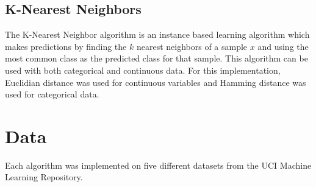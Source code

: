 \documentclass[11pt]{article}
\begin{document}
\subsection{K-Nearest Neighbors}
The K-Nearest Neighbor algorithm is an instance based learning algorithm which makes predictions by finding the $k$ nearest neighbors of a sample $x$ and using the most common class as the predicted class for that sample. This algorithm can be used with both categorical and continuous data. For this implementation, Euclidian distance was used for continuous variables and Hamming distance was used for categorical data.

\section{Data}
Each algorithm was implemented on five different datasets from the UCI Machine Learning Repository.
\end{document}
